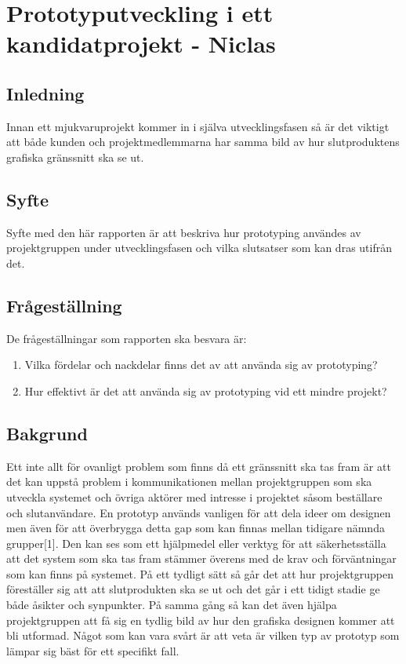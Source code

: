 \chapter{Prototyputveckling i ett kandidatprojekt - Niclas}\label{appendix:prototyp}
\section{Inledning}
Innan ett mjukvaruprojekt kommer in i själva utvecklingsfasen så är det viktigt att både kunden och projektmedlemmarna har samma bild av hur slutproduktens grafiska gränssnitt ska se ut. 

\section{Syfte}
Syfte med den här rapporten är att beskriva hur prototyping användes av projektgruppen under utvecklingsfasen och vilka slutsatser som kan dras utifrån det.   

\section{Frågeställning}
De frågeställningar som rapporten ska besvara är:
\begin{enumerate}
	\item Vilka fördelar och nackdelar finns det av att använda sig av prototyping?
	\item Hur effektivt är det att använda sig av prototyping vid ett mindre projekt?
\end{enumerate}

\section{Bakgrund}
Ett inte allt för ovanligt problem som finns då ett gränssnitt ska tas fram är att det kan uppstå problem i kommunikationen mellan projektgruppen som ska utveckla systemet och övriga aktörer med intresse i projektet såsom beställare och slutanvändare. En prototyp används vanligen för att dela ideer om designen men även för att överbrygga detta gap som kan finnas mellan tidigare nämnda grupper[1]. Den kan ses som ett hjälpmedel eller verktyg för att säkerhetsställa att det system som ska tas fram stämmer överens med de krav och förväntningar som kan finns på systemet. På ett tydligt sätt så går det att hur projektgruppen föreställer sig att att slutprodukten ska se ut och det går i ett tidigt stadie ge både åsikter och synpunkter. På samma gång så kan det även hjälpa projektgruppen att få sig en tydlig bild av hur den grafiska designen kommer att bli utformad. Något som kan vara svårt är att veta är vilken typ av prototyp som lämpar sig bäst för ett specifikt fall.

